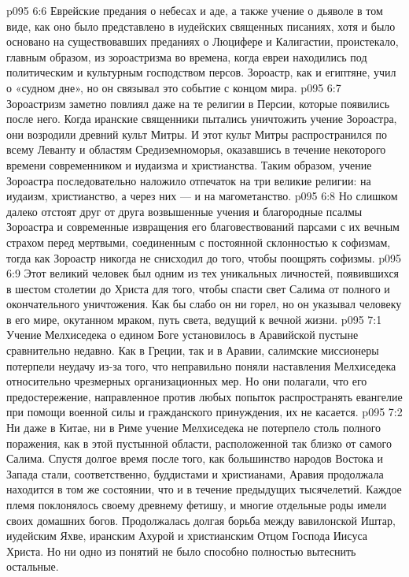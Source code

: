 \vs p095 6:6 Еврейские предания о небесах и аде, а также учение о дьяволе в том виде, как оно было представлено в иудейских священных писаниях, хотя и было основано на существовавших преданиях о Люцифере и Калигастии, проистекало, главным образом, из зороастризма во времена, когда евреи находились под политическим и культурным господством персов. Зороастр, как и египтяне, учил о «судном дне», но он связывал это событие с концом мира.
\vs p095 6:7 Зороастризм заметно повлиял даже на те религии в Персии, которые появились после него. Когда иранские священники пытались уничтожить учение Зороастра, они возродили древний культ Митры. И этот культ Митры распространился по всему Леванту и областям Средиземноморья, оказавшись в течение некоторого времени современником и иудаизма и христианства. Таким образом, учение Зороастра последовательно наложило отпечаток на три великие религии: на иудаизм, христианство, а через них --- и на магометанство.
\vs p095 6:8 \pc Но слишком далеко отстоят друг от друга возвышенные учения и благородные псалмы Зороастра и современные извращения его благовествований парсами с их вечным страхом перед мертвыми, соединенным с постоянной склонностью к софизмам, тогда как Зороастр никогда не снисходил до того, чтобы поощрять софизмы.
\vs p095 6:9 Этот великий человек был одним из тех уникальных личностей, появившихся в шестом столетии до Христа для того, чтобы спасти свет Салима от полного и окончательного уничтожения. Как бы слабо он ни горел, но он указывал человеку в его мире, окутанном мраком, путь света, ведущий к вечной жизни.
\vs p095 7:1 Учение Мелхиседека о едином Боге установилось в Аравийской пустыне сравнительно недавно. Как в Греции, так и в Аравии, салимские миссионеры потерпели неудачу из\hyp{}за того, что неправильно поняли наставления Мелхиседека относительно чрезмерных организационных мер. Но они полагали, что его предостережение, направленное против любых попыток распространять евангелие при помощи военной силы и гражданского принуждения, их не касается.
\vs p095 7:2 Ни даже в Китае, ни в Риме учение Мелхиседека не потерпело столь полного поражения, как в этой пустынной области, расположенной так близко от самого Салима. Спустя долгое время после того, как большинство народов Востока и Запада стали, соответственно, буддистами и христианами, Аравия продолжала находится в том же состоянии, что и в течение предыдущих тысячелетий. Каждое племя поклонялось своему древнему фетишу, и многие отдельные роды имели своих домашних богов. Продолжалась долгая борьба между вавилонской Иштар, иудейским Яхве, иранским Ахурой и христианским Отцом Господа Иисуса Христа. Но ни одно из понятий не было способно полностью вытеснить остальные.
